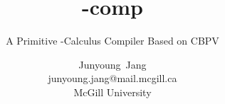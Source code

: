 \documentclass[letterpaper,10pt,aspectratio=169,dvipsnames]{beamer}
\title[\texorpdfstring{\lambda-comp}{lambdacomp}: A Primitive \texorpdfstring{\lambda-Calculus}{Lambda Calculus} Compiler Based on CBPV]{\lambda-comp}
\subtitle{A Primitive \lambda-Calculus Compiler Based on CBPV}
\author[Junyoung Jang]{\parbox{10em}{\centering Junyoung~Jang\\{}{\scriptsize junyoung.jang@mail.mcgill.ca}\\{}{\scriptsize McGill University}}}
\date{}
\begin{document}
\begin{frame}[plain]
  \titlepage
\end{frame}
\end{document}
